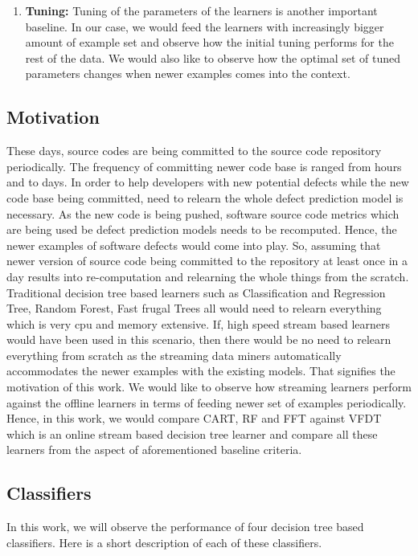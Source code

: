 \documentclass[sigplan]{acmart}\settopmatter{printfolios=true,printccs=false,printacmref=false}
\begin{document}
\begin{enumerate}
	\item \textbf{Tuning: } Tuning of the parameters of the learners is another important baseline. In our case, we would feed the learners with increasingly bigger amount of example set and observe how the initial tuning performs for the rest of the data. We would also like to observe how the optimal set of tuned parameters changes when newer examples comes into the context.
\end{enumerate}

\subsection{Motivation}
These days, source codes are being committed to the source code repository periodically. The frequency of committing newer code base is ranged from hours and to days. In order to help developers with new potential defects while the new code base being committed, need to relearn the whole defect prediction model is necessary. As the new code is being pushed, software source code metrics which are being used be defect prediction models needs to be recomputed. Hence, the newer examples of software defects would come into play. So, assuming that newer version of source code being committed to the repository at least once in a day results into re-computation and relearning the whole things from the scratch. Traditional decision tree based learners such as Classification and Regression Tree, Random Forest, Fast frugal Trees all would need to relearn everything which is very cpu and memory extensive. If, high speed stream based learners would have been used in this scenario, then there would be no need to relearn everything from scratch as the streaming data miners automatically accommodates the newer examples with the existing models. That signifies the motivation of this work. We would like to observe how streaming learners perform against the offline learners in terms of feeding newer set of examples periodically. Hence, in this work, we would compare CART, RF and FFT against VFDT which is an online stream based decision tree learner and compare all these learners from the aspect of aforementioned baseline criteria.

\subsection{Classifiers}
In this work, we will observe the performance of four decision tree based classifiers. Here is a short description of each of these classifiers.
\end{document}
